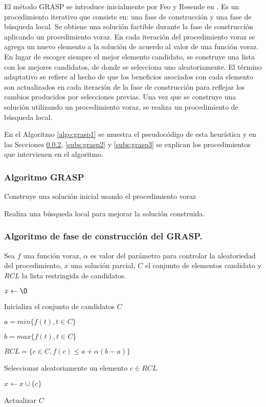 El método GRASP se introduce inicialmente por Feo y Resende en
\cite{Mladenovic:1997:VNS}. Es un procedimiento iterativo que consiste en: una
fase de construcción y una fase de búsqueda local. Se obtiene una solución
factible durante la fase de construcción aplicando un procedimiento voraz. 
En cada iteración del procedimiento voraz se agrega un nuevo elemento a la 
solución de acuerdo al valor de una función voraz. En lugar de escoger siempre
el mejor elemento candidato, se construye una lista con los mejores candidatos,
de donde se selecciona uno aleatoriamente. El término adaptativo se refiere al
hecho de que los beneficios asociados con cada elemento son actualizados en cada
iteración de la fase de construcción para reflejar los cambios producidos por 
selecciones previas. Una vez que se construye una solución utilizando un 
procedimiento voraz, se realiza un procedimiento de búsqueda local. 

En el Algoritmo \ref{algo:grasp1} se muestra el pseudocódigo de esta heurística
y en las Secciones \ref{subs:grasp1}, \ref{subs:grasp2} y \ref{subs:grasp3} se
explican los procedimientos que intervienen en el algoritmo.

\subsubsection{Algoritmo GRASP}
\begin{algorithm}[H]
 {

Construye una solución inicial usando el procedimiento voraz

Realiza una búsqueda local para mejorar la solución construida.

}
\caption{Pasos del \texttt{GRASP}}
\label{algo:grasp1}
\end{algorithm}

\subsubsection{Algoritmo de fase de construcción del GRASP.} \label{subs:grasp1}

Sea $f$ una función voraz, $\alpha$ es valor del parámetro para controlar la
aleatoriedad del procedimiento, $x$ una solución parcial, $C$ el conjunto de 
elementos candidato y $RCL$ la lista restringida de candidatos.

\begin{algorithm}[H]
$x \leftarrow {\O}$

Inicializa el conjunto de candidatos $C$

 {

  $a = min\{f(t), t \in C\}$

  $b = max\{f(t), t \in C\}$

  $RCL = \{c \in C, f(c)\le a + \alpha(b - a)\}$

  Seleccionar aleatoriamente un elemento $c \in RCL$

  $x \leftarrow x \cup\{c\}$

  Actualizar $C$
}

\caption{Pseudo-código constructivo para \texttt{GRASP}}
\label{algo:grasp2}
\end{algorithm}

